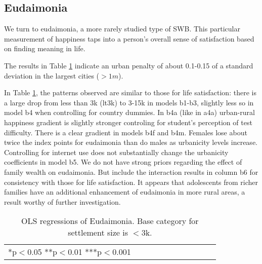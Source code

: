 \documentclass[10pt, letterpaper]{article}
\begin{document}
\begin{spacing}{1.4}
                                                       






\subsection*{Eudaimonia}

We turn to eudaimonia, a more rarely studied type of SWB. This particular measurement of happiness taps into a person's overall sense of satisfaction based on finding meaning in life. 

The results in Table \ref{regB} indicate an urban penalty of about 0.1-0.15 of a standard deviation in the largest cities ($>1m$).

 In Table \ref{regB}, the patterns observed are similar to those for life
 satisfaction: there is a large drop from less than 3k (lt3k) to 3-15k in models
 b1-b3, slightly less so
 in model b4 when controlling for country dummies. In b4a (like in a4a)
 urban-rural happiness gradient is slightly stronger controling for student's perception
 of test difficulty. There is a clear gradient in
 models b4f and b4m. Females lose about twice the index points for eudaimonia
 than do males as urbanicity levels increase. 
Controlling for internet use does not substantially change  the urbanicity
coefficients in model b5. %
We do not
have strong priors regarding the effect of family wealth on eudaimonia. But include the interaction results in
column b6 %
 for consistency with those for life satisfaction. %
It appears that adolescents from richer families have an additional enhancement
of eudaimonia in more rural areas, a result worthy of further investigation.


\begin{table}[H]\centering\caption{OLS regressions of Eudaimonia. Base category for settlement size is $<$3k.} \label{regB} \begin{scriptsize} \begin{tabular}{p{1.6in}p{.5in}p{.5in}p{.5in}p{.5in}p{.5in}|p{.5in}p{.5in}|p{.5in}|p{.5in}p{.5in}p{.5 in}p{.5in}p{.5 in}}\hline  \hline\multicolumn{4}{l}{*p$<$0.05 **p$<$0.01 ***p$<$0.001} \end{tabular}\end{scriptsize}\end{table}




\end{spacing}
\end{document}
